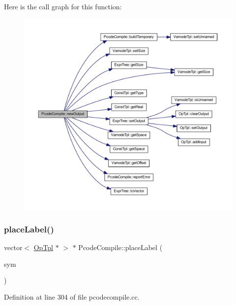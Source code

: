 Here is the call graph for this function\+:
\nopagebreak
\begin{figure}[H]
\begin{center}
\leavevmode
\includegraphics[width=350pt]{class_pcode_compile_ac43f27f167fc5fdc1bb3531346dc6797_cgraph}
\end{center}
\end{figure}
\mbox{\label{class_pcode_compile_a838d3e556360e1fd8f365453165a0cda}} 
\subsubsection{\texorpdfstring{placeLabel()}{placeLabel()}}
{\footnotesize\ttfamily vector$<$ \mbox{\hyperlink{class_op_tpl}{Op\+Tpl}} $\ast$ $>$ $\ast$ Pcode\+Compile\+::place\+Label (\begin{DoxyParamCaption}\item[{\mbox{\hyperlink{class_label_symbol}{Label\+Symbol}} $\ast$}]{sym }\end{DoxyParamCaption})}



Definition at line 304 of file pcodecompile.\+cc.

